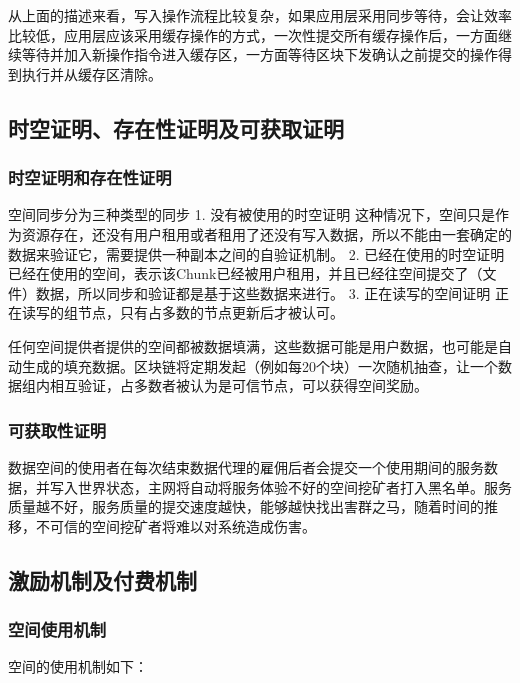 \documentclass[a4paper,12pt]{article}
\begin{document}
从上面的描述来看，写入操作流程比较复杂，如果应用层采用同步等待，会让效率比较低，应用层应该采用缓存操作的方式，一次性提交所有缓存操作后，一方面继续等待并加入新操作指令进入缓存区，一方面等待区块下发确认之前提交的操作得到执行并从缓存区清除。

\subsection{时空证明、存在性证明及可获取证明}
\subsubsection{时空证明和存在性证明}

空间同步分为三种类型的同步
1.	没有被使用的时空证明
这种情况下，空间只是作为资源存在，还没有用户租用或者租用了还没有写入数据，所以不能由一套确定的数据来验证它，需要提供一种副本之间的自验证机制。
2.	已经在使用的时空证明
已经在使用的空间，表示该Chunk已经被用户租用，并且已经往空间提交了（文件）数据，所以同步和验证都是基于这些数据来进行。
3.	正在读写的空间证明
正在读写的组节点，只有占多数的节点更新后才被认可。

任何空间提供者提供的空间都被数据填满，这些数据可能是用户数据，也可能是自动生成的填充数据。区块链将定期发起（例如每20个块）一次随机抽查，让一个数据组内相互验证，占多数者被认为是可信节点，可以获得空间奖励。

\subsubsection{可获取性证明}

数据空间的使用者在每次结束数据代理的雇佣后者会提交一个使用期间的服务数据，并写入世界状态，主网将自动将服务体验不好的空间挖矿者打入黑名单。服务质量越不好，服务质量的提交速度越快，能够越快找出害群之马，随着时间的推移，不可信的空间挖矿者将难以对系统造成伤害。

\subsection{激励机制及付费机制}
\subsubsection{空间使用机制}

空间的使用机制如下：
\end{document}
